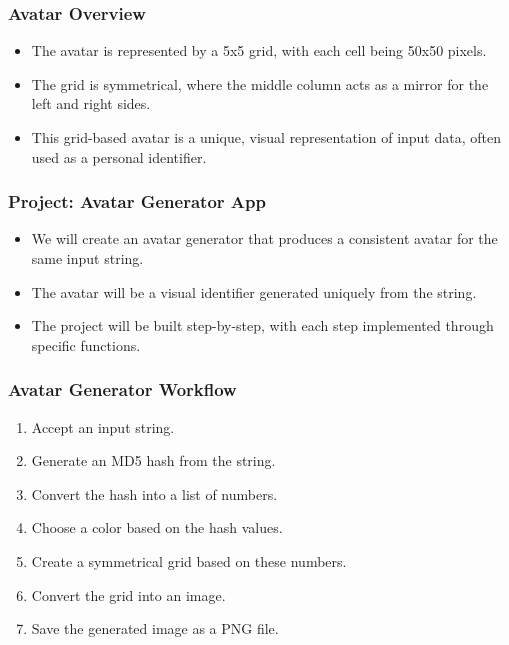 \documentclass[aspectratio=169, table]{beamer}
\begin{document}
	
	\begin{frame}
		\frametitle{Avatar Overview}
		\begin{itemize}
			\item The avatar is represented by a 5x5 grid, with each cell being 50x50 pixels.
			\item The grid is symmetrical, where the middle column acts as a mirror for the left and right sides.
			\item This grid-based avatar is a unique, visual representation of input data, often used as a personal identifier.
		\end{itemize}
	\end{frame}
	
	\begin{frame}
		\frametitle{Project: Avatar Generator App}
		\begin{itemize}
			\item We will create an avatar generator that produces a consistent avatar for the same input string.
			\item The avatar will be a visual identifier generated uniquely from the string.
			\item The project will be built step-by-step, with each step implemented through specific functions.
		\end{itemize}
	\end{frame}
	
	\begin{frame}
		\frametitle{Avatar Generator Workflow}
		\begin{enumerate}
			\item Accept an input string.
			\item Generate an MD5 hash from the string.
			\item Convert the hash into a list of numbers.
			\item Choose a color based on the hash values.
			\item Create a symmetrical grid based on these numbers.
			\item Convert the grid into an image.
			\item Save the generated image as a PNG file.
		\end{enumerate}
	\end{frame}
	
\end{document}
